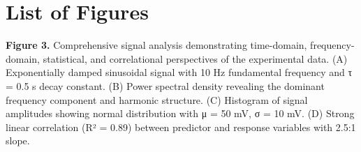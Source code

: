 \section{List of Figures}

\textbf{Figure 3.} Comprehensive signal analysis demonstrating time-domain, frequency-domain, statistical, and correlational perspectives of the experimental data. (A) Exponentially damped sinusoidal signal with 10 Hz fundamental frequency and τ = 0.5 s decay constant. (B) Power spectral density revealing the dominant frequency component and harmonic structure. (C) Histogram of signal amplitudes showing normal distribution with μ = 50 mV, σ = 10 mV. (D) Strong linear correlation (R² = 0.89) between predictor and response variables with 2.5:1 slope.\\

